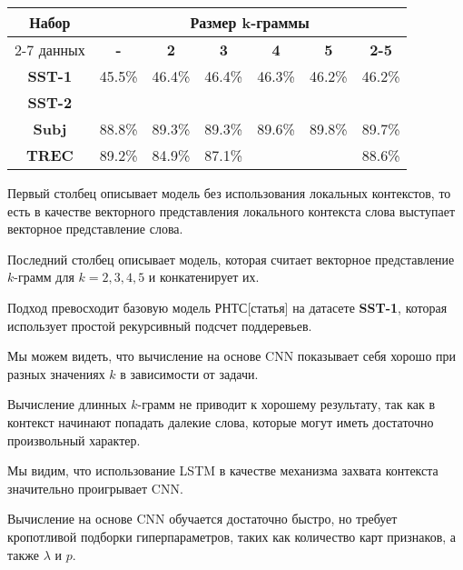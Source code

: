 \noindent \begin{minipage}{\linewidth}
 \label{tab:title} 
\begin{tabular}{|c|c|c|c|c|c|c|}
\hline
\multirow{2}{*}{Набор}   &                \multicolumn{6}{c|}{Размер k-граммы} \\ \cline{2-7} 
     данных              & \textbf{-}   &   \textbf{2} & \textbf{3} & \textbf{4} & \textbf{5} & \textbf{2-5} \\ \hline
\textbf{SST-1}           &  45.5\%      & 46.4\%       & 46.4\%     & 46.3\%     &  46.2\%    & 46.2\%           \\  \hline
\textbf{SST-2}           &              &              &            &            &            & \\ \hline
\textbf{Subj}            &  88.8\%      & 89.3\%       & 89.3\%     & 89.6\%     &  89.8\%    & 89.7\% \\ \hline
\textbf{TREC}            &  89.2\%      & 84.9\%       & 87.1\%     &            &            & 88.6\%  \\ \hline
\end{tabular}
\vspace{5mm}
\end{minipage}
\vspace{5mm}

Первый столбец описывает модель без использования локальных контекстов, то есть в качестве векторного представления локального контекста слова выступает векторное представление слова.

Последний столбец описывает модель, которая считает векторное представление $k$-грамм для $k=2,3,4,5$ и конкатенирует их.

Подход превосходит базовую модель РНТС[статья] на датасете \textbf{SST-1},
которая использует простой рекурсивный подсчет поддеревьев.

Мы можем видеть, что вычисление на основе CNN показывает себя хорошо при разных значениях $k$ в зависимости от задачи.

Вычисление длинных $k$-грамм не приводит к хорошему результату, так как в контекст начинают попадать далекие слова, 
которые могут иметь достаточно произвольный характер.

Мы видим, что использование LSTM в качестве механизма захвата контекста значительно проигрывает CNN.

Вычисление на основе CNN обучается достаточно быстро, но требует кропотливой подборки гиперпараметров, 
таких как количество карт признаков, а также $\lambda$ и $p$.

